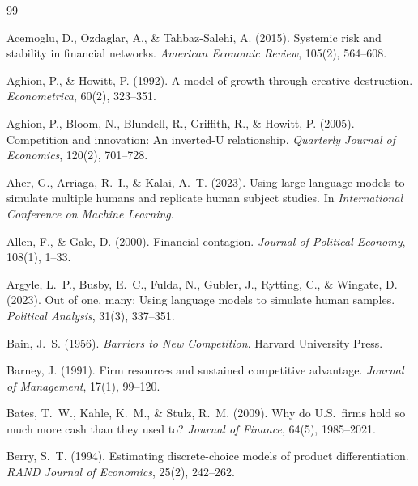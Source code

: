 \documentclass[11pt]{article}
\begin{document}
\begin{thebibliography}{99}

Acemoglu, D., Ozdaglar, A., \& Tahbaz-Salehi, A. (2015).
\newblock Systemic risk and stability in financial networks.
\newblock \emph{American Economic Review}, 105(2), 564--608.

Aghion, P., \& Howitt, P. (1992).
\newblock A model of growth through creative destruction.
\newblock \emph{Econometrica}, 60(2), 323--351.

Aghion, P., Bloom, N., Blundell, R., Griffith, R., \& Howitt, P. (2005).
\newblock Competition and innovation: An inverted-U relationship.
\newblock \emph{Quarterly Journal of Economics}, 120(2), 701--728.

Aher, G., Arriaga, R.~I., \& Kalai, A.~T. (2023).
\newblock Using large language models to simulate multiple humans and replicate human subject studies.
\newblock In \emph{International Conference on Machine Learning}.

Allen, F., \& Gale, D. (2000).
\newblock Financial contagion.
\newblock \emph{Journal of Political Economy}, 108(1), 1--33.

Argyle, L.~P., Busby, E.~C., Fulda, N., Gubler, J., Rytting, C., \& Wingate, D. (2023).
\newblock Out of one, many: Using language models to simulate human samples.
\newblock \emph{Political Analysis}, 31(3), 337--351.

Bain, J.~S. (1956).
\newblock \emph{Barriers to New Competition}.
\newblock Harvard University Press.

Barney, J. (1991).
\newblock Firm resources and sustained competitive advantage.
\newblock \emph{Journal of Management}, 17(1), 99--120.

Bates, T.~W., Kahle, K.~M., \& Stulz, R.~M. (2009).
\newblock Why do U.S.\ firms hold so much more cash than they used to?
\newblock \emph{Journal of Finance}, 64(5), 1985--2021.

Berry, S.~T. (1994).
\newblock Estimating discrete-choice models of product differentiation.
\newblock \emph{RAND Journal of Economics}, 25(2), 242--262.


\end{thebibliography}
\end{document}
